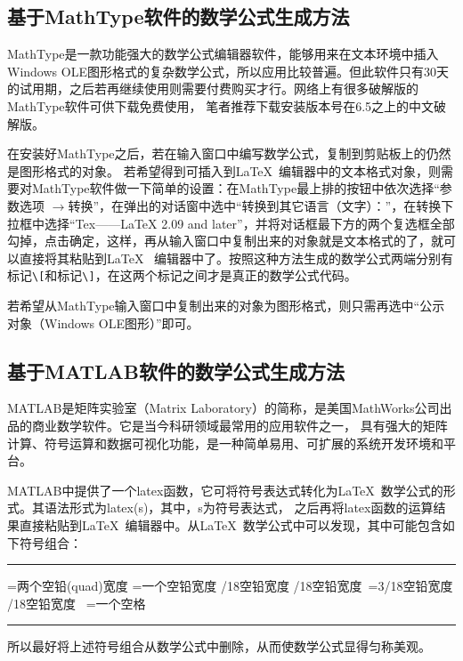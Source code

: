 \subsection{基于MathType软件的数学公式生成方法}
MathType是一款功能强大的数学公式编辑器软件，能够用来在文本环境中插入Windows OLE图形格式的复杂数学公式，所以应用比较普遍。但此软件只有30天的试用期，之后若再继续使用则需要付费购买才行。网络上有很多破解版的MathType软件可供下载免费使用，
笔者推荐下载安装版本号在6.5之上的中文破解版。

在安装好MathType之后，若在输入窗口中编写数学公式，复制到剪贴板上的仍然是图形格式的对象。
若希望得到可插入到\LaTeX~编辑器中的文本格式对象，则需要对MathType软件做一下简单的设置：在MathType最上排的按钮中依次选择“参数选项
$\to$转换”，在弹出的对话窗中选中“转换到其它语言（文字）：”，在转换下拉框中选择“Tex——LaTeX 2.09 and later”，并将对话框最下方的两个复选框全部勾掉，点击确定，这样，再从输入窗口中复制出来的对象就是文本格式的了，就可以直接将其粘贴到\LaTeX~
编辑器中了。按照这种方法生成的数学公式两端分别有标记\verb|\[|和标记\verb|\]|，在这两个标记之间才是真正的数学公式代码。

若希望从MathType输入窗口中复制出来的对象为图形格式，则只需再选中“公示对象（Windows OLE图形）”即可。

\subsection{基于MATLAB软件的数学公式生成方法}
MATLAB是矩阵实验室（Matrix Laboratory）的简称，是美国MathWorks公司出品的商业数学软件。它是当今科研领域最常用的应用软件之一，
具有强大的矩阵计算、符号运算和数据可视化功能，是一种简单易用、可扩展的系统开发环境和平台。

MATLAB中提供了一个latex函数，它可将符号表达式转化为\LaTeX~数学公式的形式。其语法形式为latex(s)，其中，s为符号表达式，
之后再将latex函数的运算结果直接粘贴到\LaTeX~编辑器中。从\LaTeX~数学公式中可以发现，其中可能包含如下符号组合：

\vspace{1em}\noindent\hrule

\begin{verbatim*}
	\qquad=两个空铅(quad)宽度
	\quad=一个空铅宽度
	/18空铅宽度
	/18空铅宽度
	\,=3/18空铅宽度
	/18空铅宽度
	\ =一个空格
\end{verbatim*}

\noindent\hrule\vspace{1em}

所以最好将上述符号组合从数学公式中删除，从而使数学公式显得匀称美观。


